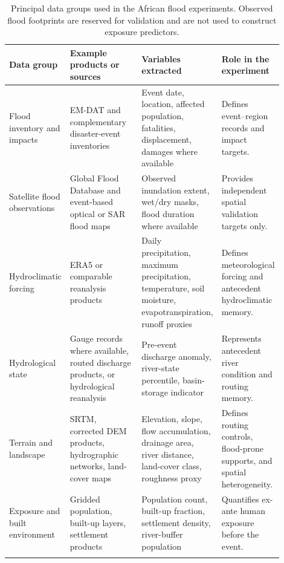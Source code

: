\documentclass[pdflatex,sn-mathphys-ay]{sn-jnl}
\theoremstyle{thmstyleone}
\theoremstyle{thmstylethree}
\theoremstyle{thmstyletwo}
\begin{document}
\begin{appendices}
\begin{table}[t]
\centering
\small
\caption{
Principal data groups used in the African flood experiments.
Observed flood footprints are reserved for validation and are not used
to construct exposure predictors.
}
\label{tab:app_data_sources}
\begin{tabular}{p{0.19\linewidth}p{0.27\linewidth}
                p{0.24\linewidth}p{0.20\linewidth}}
\toprule
Data group & Example products or sources & Variables extracted
& Role in the experiment \\
\midrule
Flood inventory and impacts
&
EM-DAT and complementary disaster-event inventories
&
Event date, location, affected population, fatalities,
displacement, damages where available
&
Defines event--region records and impact targets. \\

Satellite flood observations
&
Global Flood Database and event-based optical or SAR flood maps
\citep{Tellman2021}
&
Observed inundation extent, wet/dry masks, flood duration where
available
&
Provides independent spatial validation targets only. \\

Hydroclimatic forcing
&
ERA5 or comparable reanalysis products
&
Daily precipitation, maximum precipitation, temperature,
soil moisture, evapotranspiration, runoff proxies
&
Defines meteorological forcing and antecedent hydroclimatic
memory. \\

Hydrological state
&
Gauge records where available, routed discharge products,
or hydrological reanalysis
&
Pre-event discharge anomaly, river-state percentile,
basin-storage indicator
&
Represents antecedent river condition and routing memory. \\

Terrain and landscape
&
SRTM, corrected DEM products, hydrographic networks,
land-cover maps
\citep{Farr2007,Hawker2022}
&
Elevation, slope, flow accumulation, drainage area, river
distance, land-cover class, roughness proxy
&
Defines routing controls, flood-prone supports, and spatial
heterogeneity. \\

Exposure and built environment
&
Gridded population, built-up layers, settlement products
&
Population count, built-up fraction, settlement density,
river-buffer population
&
Quantifies ex-ante human exposure before the event. \\
\botrule
\end{tabular}
\end{table}


\end{appendices}
\end{document}
